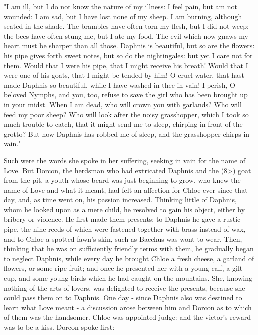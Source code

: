 \documentclass{book}
\begin{document}
\begin{pairs}
\begin{Rightside}
\begin{english}
  "I am ill, but I do not know the nature of my illness: I feel pain, but am not wounded: I am sad, but I have lost none of my sheep.  I am burning, although seated in the shade.  The brambles have often torn my flesh, but I did not weep: the bees have often stung me, but I ate my food.  The evil which now gnaws my heart must be sharper than all those.  Daphnis is beautiful, but so are the flowers: his pipe gives forth sweet notes, but so do the nightingales: but yet I care not for them.  Would that I were his pipe, that I might receive his breath!  Would that I were one of his goats, that I might be tended by him!  O cruel water, that hast made Daphnis so beautiful, while I have washed in thee in vain!  I perish, O beloved Nymphs, and you, too, refuse to save the girl who has been brought up in your midst.  When I am dead, who will crown you with garlands?  Who will feed my poor sheep?  Who will look after the noisy grasshopper, which I took so much trouble to catch, that it might send me to sleep, chirping in front of the grotto?  But now Daphnis has robbed me of sleep, and the grasshopper chirps in vain."
\pend


  Such were the words she spoke in her suffering, seeking in vain for the name of Love.  But Dorcon, the herdsman who had extricated Daphnis and the (8>) goat from the pit, a youth whose beard was just beginning to grow, who knew the name of Love and what it meant, had felt an affection for Chloe ever since that day, and, as time went on, his passion increased.  Thinking little of Daphnis, whom he looked upon as a mere child, he resolved to gain his object, either by bribery or violence.  He first made them presents: to Daphnis he gave a rustic pipe, the nine reeds of which were fastened together with brass instead of wax, and to Chloe a spotted fawn's skin, such as Bacchus was wont to wear.  Then, thinking that he was on sufficiently friendly terms with them, he gradually began to neglect Daphnis, while every day he brought Chloe a fresh cheese, a garland of flowers, or some ripe fruit; and once he presented her with a young calf, a gilt cup, and some young birds which he had caught on the mountains.  She, knowing nothing of the arts of lovers, was delighted to receive the presents, because she could pass them on to Daphnis.  One day - since Daphnis also was destined to learn what Love meant - a discussion arose between him and Dorcon as to which of them was the handsomer.  Chloe was appointed judge: and the victor's reward was to be a kiss.  Dorcon spoke first:
\pend



\end{english}
\end{Rightside}
\end{pairs}
\end{document}
